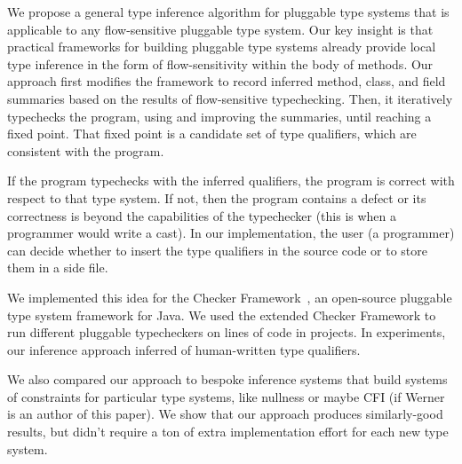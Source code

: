 %
%

We propose a general type inference algorithm for pluggable type
systems that is applicable to any flow-sensitive pluggable type system.
Our key insight is that
practical frameworks for building pluggable type systems already provide
local type inference in the form of flow-sensitivity within the body
of methods.
Our approach first
modifies the framework to record inferred method, class, and field summaries
based on the results of flow-sensitive typechecking.
Then, it iteratively typechecks the program, using and improving the
summaries, until reaching a fixed point.
That fixed point is a candidate set of type qualifiers, which are
consistent with the program.

If the program typechecks with the inferred qualifiers, the program
is correct with respect to that type system.
If not, then the program contains a defect
or its correctness is beyond the capabilities of the
typechecker (this is when a programmer would write a cast).
In our implementation, the user (a programmer) can decide whether to insert
the type qualifiers in the source code or to store them in a side file.

We implemented this idea for the Checker Framework~\cite{PapiACPE2008},
an open-source pluggable type system
framework for Java.
%
%
We used the extended Checker Framework to run \numTypeSystems different pluggable typecheckers
on \numLOC lines of code in \numProjects projects.
In experiments, our inference approach inferred \percentInferred of human-written
type qualifiers.

We also compared our approach to bespoke inference systems that build
systems of constraints for particular type systems, like nullness or
maybe CFI (if Werner is an author of this paper). We show that our approach
produces similarly-good results, but didn't require a ton of extra
implementation effort for each new type system.

